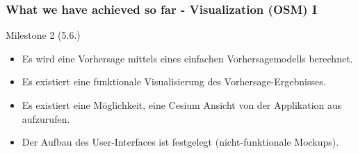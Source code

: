 \documentclass[xcolor=dvipsnames]{beamer}
\begin{document}
\begin{frame}
	\frametitle{What we have achieved so far - Visualization (OSM) I}
	\large{Milestone 2 (5.6.)}
	\normalsize
	\begin{itemize} 
		\item \color{LightGray}Es wird eine Vorhersage mittels eines einfachen Vorhersagemodells berechnet.
		\item \color{Green}Es existiert eine funktionale Visualisierung des Vorhersage-Ergebnisses.
		\item \color{LightGray}Es existiert eine Möglichkeit, eine Cesium Ansicht von der Applikation aus aufzurufen.
		\item \color{LightGray}Der Aufbau des User-Interfaces ist festgelegt (nicht-funktionale Mockups).
	\end{itemize}
\end{frame}
\end{document}
